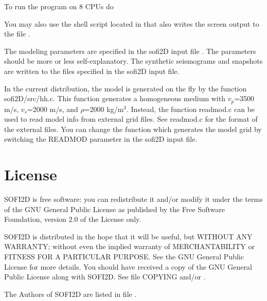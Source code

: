 \documentclass[11pt,onecolumn,oneside]{article}
\begin{document}
To run the program on 8 CPUs do




You may also use the shell script  located in  that also writes the screen output to the file .

The modeling parameters are specified in the sofi2D input file . The parameters should be more or less self-explanatory. The synthetic seismograms and snapshots are written to the files specified in the sofi2D input file.

In the current distribution, the model is generated on the fly by the function sofi2D/src/hh.c. This function generates a homogeneous medium with $v_p$=3500 m/s, $v_s$=2000 m/s, and $\rho$=2000 kg/$\mathrm{m}^3$. Instead, the function readmod.c can be used to read model info from external grid files. See readmod.c for the format of the external files. You can change the function which generates the model grid by switching the READMOD parameter in the sofi2D input file.


\section{License}\label{license}

SOFI2D is free software: you can redistribute it and/or modify it under the terms of the GNU General Public License as published by the Free Software Foundation, version 2.0 of the License only.
 
SOFI2D is distributed in the hope that it will be useful, but WITHOUT ANY WARRANTY; without even the implied warranty of MERCHANTABILITY or FITNESS FOR A PARTICULAR PURPOSE. See the GNU General Public License for more details. You should have received a copy of the GNU General Public License along with SOFI2D. See file COPYING and/or .

The Authors of SOFI2D are listed in file .
\end{document}
